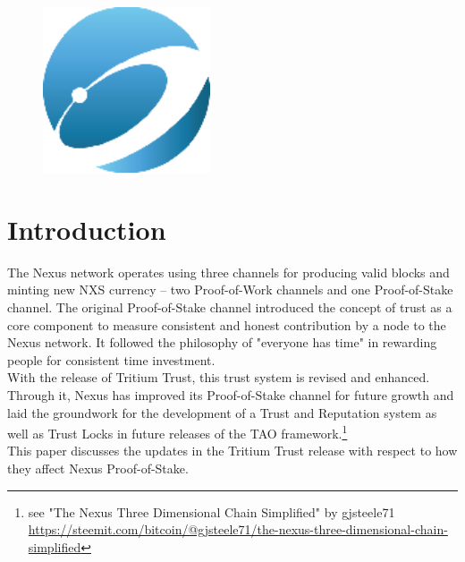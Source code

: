 \documentclass[11pt]{article}
\title{\rmfamily\normalfont{Nexus Proof-of-Stake with Tritium Trust}}
\author{Colin Cantrell\\
\and Scott Simon}
\date{October 3, 2018}
\begin{document}

\begin{figure}
    \centering
	\includegraphics[width=0.44\textwidth]{images/logo.png}
\end{figure}

\maketitle

\newpage
{}

\bigskip

\section{Introduction}
The Nexus network operates using three channels for producing valid blocks and minting new NXS currency -- two Proof-of-Work channels and one Proof-of-Stake channel. The original Proof-of-Stake channel introduced the concept of trust as a core component to measure consistent and honest contribution by a node to the Nexus network. It followed the philosophy of "everyone has time" in rewarding people for consistent time investment.\\

\noindent With the release of Tritium Trust, this trust system is revised and enhanced. Through it, Nexus has improved its Proof-of-Stake channel for future growth and laid the groundwork for the development of a Trust and Reputation system as well as Trust Locks in future releases of the TAO framework.\footnote{see "The Nexus Three Dimensional Chain Simplified" by gjsteele71\\ \url{https://steemit.com/bitcoin/@gjsteele71/the-nexus-three-dimensional-chain-simplified}} \\ 

\noindent This paper discusses the updates in the Tritium Trust release with respect to how they affect Nexus Proof-of-Stake.
\end{document}
